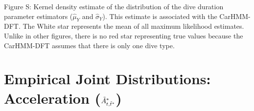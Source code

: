 \documentclass{article}
\begin{document}
        \noindent Figure S: Kernel density estimate of the distribution of the dive duration parameter estimators ($\hat \mu_Y$ and $\hat \sigma_Y$). This estimate is associated with the CarHMM-DFT. The White star represents the mean of all maximum likelihood estimates. Unlike in other figures, there is no red star representing true values because the CarHMM-DFT assumes that there is only one dive type.
        \addtocounter{fignum}{1}
    
    \newpage
    \section{Empirical Joint Distributions: Acceleration ($\tilde{A}^*_{t,\tilde t^*}$)}

        \begin{center}
\end{center}
\end{document}
